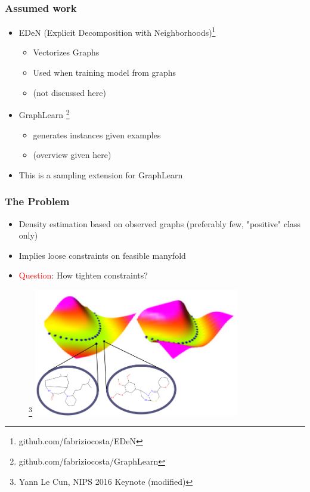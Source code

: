 \documentclass{beamer}
\newcommand{\red}[1]{\textcolor{red}{#1}}
\begin{document}
\begin{frame}
\frametitle{Assumed work}
    \begin{itemize}
        \item EDeN (Explicit Decomposition with Neighborhoods)\footnote{github.com/fabriziocosta/EDeN}
        \begin{itemize}
            \item Vectorizes Graphs
            \item Used when training model from graphs
            \item (not discussed here)
        \end{itemize}    
    
    \item GraphLearn \footnote{github.com/fabriziocosta/GraphLearn} 
        \begin{itemize}
            \item generates instances given examples
            \item (overview given here)
        \end{itemize}    
        \item This is a sampling extension for GraphLearn
    \end{itemize}    

\end{frame}
\begin{frame}
\frametitle{The Problem}
    \begin{itemize}
        \item Density estimation based on observed graphs (preferably few, "positive"
            class only)
        \item Implies loose constraints on feasible manyfold
        \item \red{Question}: How tighten constraints?
    \end{itemize}
    \begin{figure}[ht]
        \centering
        \footnote{ Yann Le Cun, NIPS 2016 Keynote (modified)}
        \includegraphics[width=0.8\textwidth]{images/valley.png}
    \end{figure}    
\end{frame}
\end{document}

